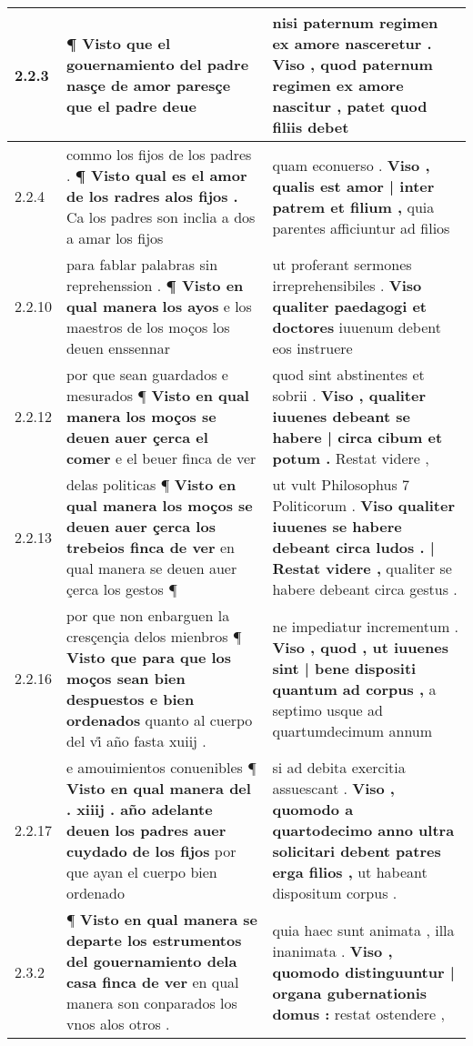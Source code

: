 \begin{tabular}{|p{1cm}|p{6.5cm}|p{6.5cm}|}
2.2.3 & ¶ \textbf{ Visto que el gouernamiento del padre nasçe de amor paresçe } que el padre deue & nisi paternum regimen ex amore nasceretur . \textbf{ Viso , quod paternum regimen ex amore nascitur , } patet quod filiis debet \\\hline
2.2.4 & commo los fijos de los padres . \textbf{ ¶ Visto qual es el amor de los radres alos fijos . } Ca los padres son inclia a dos a amar los fijos & quam econuerso . \textbf{ Viso , qualis est amor | inter patrem et filium , } quia parentes afficiuntur ad filios \\\hline
2.2.10 & para fablar palabras sin reprehenssion . \textbf{ ¶ Visto en qual manera los ayos } e los maestros de los moços los deuen enssennar & ut proferant sermones irreprehensibiles . \textbf{ Viso qualiter paedagogi et doctores } iuuenum debent eos instruere \\\hline
2.2.12 & por que sean guardados e mesurados ¶ \textbf{ Visto en qual manera los moços se deuen auer çerca el comer } e el beuer finca de ver & quod sint abstinentes et sobrii . \textbf{ Viso , qualiter iuuenes debeant se habere | circa cibum et potum . } Restat videre , \\\hline
2.2.13 & delas politicas ¶ \textbf{ Visto en qual manera los moços se deuen auer çerca los trebeios finca de ver } en qual manera se deuen auer çerca los gestos ¶ & ut vult Philosophus 7 Politicorum . \textbf{ Viso qualiter iuuenes se habere debeant circa ludos . | Restat videre , } qualiter se habere debeant circa gestus . \\\hline
2.2.16 & por que non enbarguen la cresçençia delos mienbros ¶ \textbf{ Visto que para que los moços sean bien despuestos e bien ordenados } quanto al cuerpo del vi̊ año fasta xuiij . & ne impediatur incrementum . \textbf{ Viso , quod , ut iuuenes sint | bene dispositi quantum ad corpus , } a septimo usque ad quartumdecimum annum \\\hline
2.2.17 & e amouimientos conuenibles ¶ \textbf{ Visto en qual manera del . xiiij . año adelante deuen los padres auer cuydado de los fijos } por que ayan el cuerpo bien ordenado & si ad debita exercitia assuescant . \textbf{ Viso , quomodo a quartodecimo anno ultra solicitari debent patres erga filios , } ut habeant dispositum corpus . \\\hline
2.3.2 & ¶ \textbf{ Visto en qual manera se departe los estrumentos del gouernamiento dela casa finca de ver } en qual manera son conparados los vnos alos otros . & quia haec sunt animata , illa inanimata . \textbf{ Viso , quomodo distinguuntur | organa gubernationis domus : } restat ostendere , \\\hline

\end{tabular}
